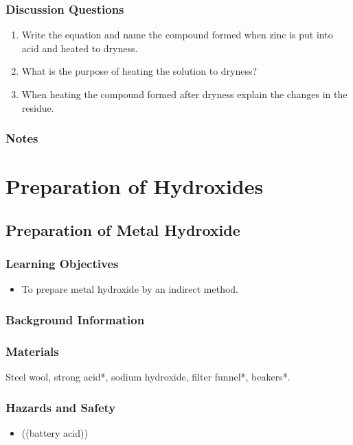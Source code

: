 \subsubsection*{Discussion Questions}
\begin{enumerate}
\item{Write the equation and name the compound formed when zinc is put into acid and heated to dryness.}
\item{What is the purpose of heating the solution to dryness?}
\item{When heating the compound formed after dryness explain the changes in the residue.}
\end{enumerate}

\subsubsection*{Notes}


\section{Preparation of Hydroxides}

\subsection{Preparation of Metal Hydroxide}

\subsubsection*{Learning Objectives}
\begin{itemize}
\item{To prepare metal hydroxide by an indirect method.}
\end{itemize}

\subsubsection*{Background Information}


\subsubsection*{Materials}
Steel wool, strong acid*, sodium hydroxide, filter funnel*, beakers*.

\subsubsection*{Hazards and Safety}
\begin{itemize}
\item{((battery acid))}
\end{itemize}

